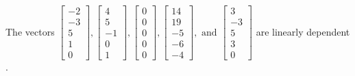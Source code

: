 \begin{exercise}
\begin{exerciseStatement}
  \end{exerciseStatement}
  \begin{exerciseAnswer}
   The vectors \(\left[\begin{array}{r}
-2 \\
-3 \\
5 \\
1 \\
0
\end{array}\right] , \left[\begin{array}{r}
4 \\
5 \\
-1 \\
0 \\
1
\end{array}\right] , \left[\begin{array}{r}
0 \\
0 \\
0 \\
0 \\
0
\end{array}\right] , \left[\begin{array}{r}
14 \\
19 \\
-5 \\
-6 \\
-4
\end{array}\right] , \text{ and } \left[\begin{array}{r}
3 \\
-3 \\
5 \\
3 \\
0
\end{array}\right]\) are 
  	 linearly dependent  .
  


  \end{exerciseAnswer}
\end{exercise}